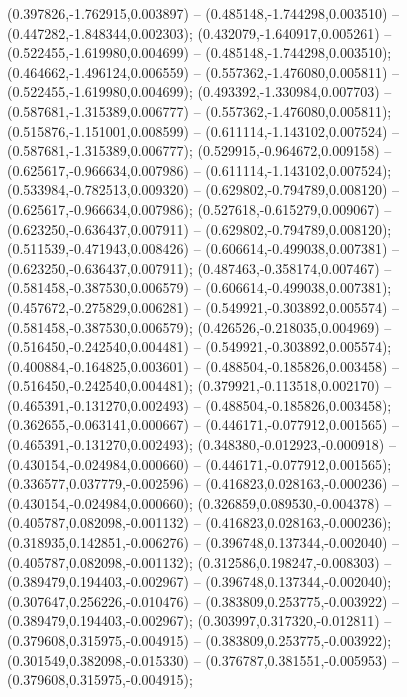  (0.397826,-1.762915,0.003897) -- (0.485148,-1.744298,0.003510) -- (0.447282,-1.848344,0.002303);
 (0.432079,-1.640917,0.005261) -- (0.522455,-1.619980,0.004699) -- (0.485148,-1.744298,0.003510);
 (0.464662,-1.496124,0.006559) -- (0.557362,-1.476080,0.005811) -- (0.522455,-1.619980,0.004699);
 (0.493392,-1.330984,0.007703) -- (0.587681,-1.315389,0.006777) -- (0.557362,-1.476080,0.005811);
 (0.515876,-1.151001,0.008599) -- (0.611114,-1.143102,0.007524) -- (0.587681,-1.315389,0.006777);
 (0.529915,-0.964672,0.009158) -- (0.625617,-0.966634,0.007986) -- (0.611114,-1.143102,0.007524);
 (0.533984,-0.782513,0.009320) -- (0.629802,-0.794789,0.008120) -- (0.625617,-0.966634,0.007986);
 (0.527618,-0.615279,0.009067) -- (0.623250,-0.636437,0.007911) -- (0.629802,-0.794789,0.008120);
 (0.511539,-0.471943,0.008426) -- (0.606614,-0.499038,0.007381) -- (0.623250,-0.636437,0.007911);
 (0.487463,-0.358174,0.007467) -- (0.581458,-0.387530,0.006579) -- (0.606614,-0.499038,0.007381);
 (0.457672,-0.275829,0.006281) -- (0.549921,-0.303892,0.005574) -- (0.581458,-0.387530,0.006579);
 (0.426526,-0.218035,0.004969) -- (0.516450,-0.242540,0.004481) -- (0.549921,-0.303892,0.005574);
 (0.400884,-0.164825,0.003601) -- (0.488504,-0.185826,0.003458) -- (0.516450,-0.242540,0.004481);
 (0.379921,-0.113518,0.002170) -- (0.465391,-0.131270,0.002493) -- (0.488504,-0.185826,0.003458);
 (0.362655,-0.063141,0.000667) -- (0.446171,-0.077912,0.001565) -- (0.465391,-0.131270,0.002493);
 (0.348380,-0.012923,-0.000918) -- (0.430154,-0.024984,0.000660) -- (0.446171,-0.077912,0.001565);
 (0.336577,0.037779,-0.002596) -- (0.416823,0.028163,-0.000236) -- (0.430154,-0.024984,0.000660);
 (0.326859,0.089530,-0.004378) -- (0.405787,0.082098,-0.001132) -- (0.416823,0.028163,-0.000236);
 (0.318935,0.142851,-0.006276) -- (0.396748,0.137344,-0.002040) -- (0.405787,0.082098,-0.001132);
 (0.312586,0.198247,-0.008303) -- (0.389479,0.194403,-0.002967) -- (0.396748,0.137344,-0.002040);
 (0.307647,0.256226,-0.010476) -- (0.383809,0.253775,-0.003922) -- (0.389479,0.194403,-0.002967);
 (0.303997,0.317320,-0.012811) -- (0.379608,0.315975,-0.004915) -- (0.383809,0.253775,-0.003922);
 (0.301549,0.382098,-0.015330) -- (0.376787,0.381551,-0.005953) -- (0.379608,0.315975,-0.004915);
